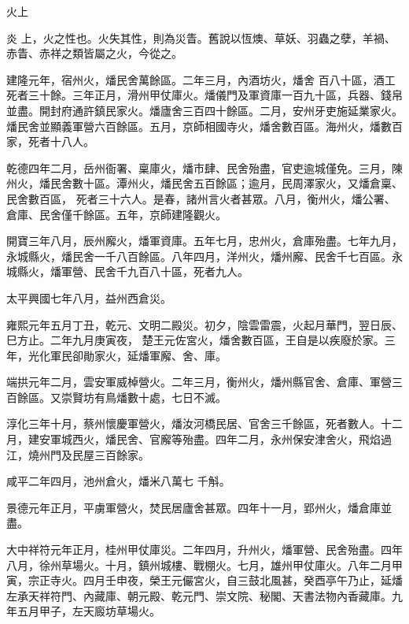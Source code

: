 
\begin{pinyinscope}

 火上



 炎
 上，火之性也。火失其性，則為災眚。舊說以恆燠、草妖、羽蟲之孽，羊禍、赤眚、赤祥之類皆屬之火，今從之。



 建隆元年，宿州火，燔民舍萬餘區。二年三月，內酒坊火，燔舍
 百八十區，酒工死者三十餘。三年正月，滑州甲仗庫火。燔儀門及軍資庫一百九十區，兵器、錢帛並盡。開封府通許鎮民家火。燔廬舍三百四十餘區。二月，安州牙吏施延業家火。燔民舍並顯義軍營六百餘區。五月，京師相國寺火，燔舍數百區。海州火，燔數百家，死者十八人。



 乾德四年二月，岳州衙署、稟庫火，燔市肆、民舍殆盡，官吏逾城僅免。三月，陳州火，燔民舍數十區。潭州火，燔民舍五百餘區；逾月，民周澤家火，又燔倉稟、民舍數百區，
 死者三十六人。是春，諸州言火者甚眾。八月，衡州火，燔公署、倉庫、民舍僅千餘區。五年，京師建隆觀火。



 開寶三年八月，辰州廨火，燔軍資庫。五年七月，忠州火，倉庫殆盡。七年九月，永城縣火，燔民舍一千八百餘區。八年四月，洋州火，燔州廨、民舍千七百區。永城縣火，燔軍營、民舍千九百八十區，死者九人。



 太平興國七年八月，益州西倉災。



 雍熙元年五月丁丑，乾元、文明二殿災。初夕，陰雲雷震，火起月華門，翌日辰、巳方止。二年九月庚寅夜，
 楚王元佐宮火，燔舍數百區，王自是以疾廢於家。三年，光化軍民卻勛家火，延燔軍廨、舍、庫。



 端拱元年二月，雲安軍威棹營火。二年三月，衡州火，燔州縣官舍、倉庫、軍營三百餘區。又崇賢坊有鳥燔數十處，七日不滅。



 淳化三年十月，蔡州懷慶軍營火，燔汝河橋民居、官舍三千餘區，死者數人。十二月，建安軍城西火，燔民舍、官廨等殆盡。四年二月，永州保安津舍火，飛焰過江，燒州門及民屋三百餘家。



 咸平二年四月，池州倉火，燔米八萬七
 千斛。



 景德元年正月，平虜軍營火，焚民居廬舍甚眾。四年十一月，郢州火，燔倉庫並盡。



 大中祥符元年正月，桂州甲仗庫災。二年四月，升州火，燔軍營、民舍殆盡。四年八月，徐州草場火。十月，鎮州城樓、戰棚火。七月，雄州甲仗庫火。八年二月甲寅，宗正寺火。四月壬申夜，榮王元儼宮火，自三鼓北風甚，癸酉亭午乃止，延燔左承天祥符門、內藏庫、朝元殿、乾元門、崇文院、秘閣、天書法物內香藏庫。九年五月甲子，左天廄坊草場火。




\end{pinyinscope}
